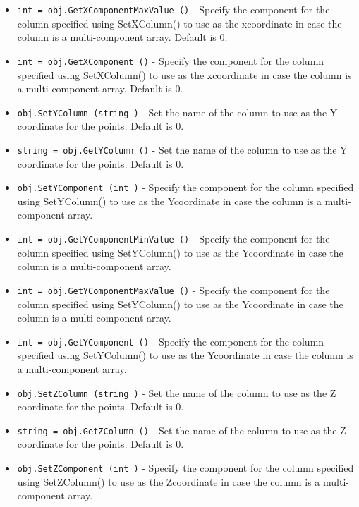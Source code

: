 \begin{itemize}
\item  \verb|int = obj.GetXComponentMaxValue ()| -  Specify the component for the column specified using SetXColumn() to
 use as the xcoordinate in case the column is a multi-component array.
 Default is 0.

\item  \verb|int = obj.GetXComponent ()| -  Specify the component for the column specified using SetXColumn() to
 use as the xcoordinate in case the column is a multi-component array.
 Default is 0.

\item  \verb|obj.SetYColumn (string )| -  Set the name of the column to use as the Y coordinate for the points. 
 Default is 0.

\item  \verb|string = obj.GetYColumn ()| -  Set the name of the column to use as the Y coordinate for the points. 
 Default is 0.

\item  \verb|obj.SetYComponent (int )| -  Specify the component for the column specified using SetYColumn() to
 use as the Ycoordinate in case the column is a multi-component array.

\item  \verb|int = obj.GetYComponentMinValue ()| -  Specify the component for the column specified using SetYColumn() to
 use as the Ycoordinate in case the column is a multi-component array.

\item  \verb|int = obj.GetYComponentMaxValue ()| -  Specify the component for the column specified using SetYColumn() to
 use as the Ycoordinate in case the column is a multi-component array.

\item  \verb|int = obj.GetYComponent ()| -  Specify the component for the column specified using SetYColumn() to
 use as the Ycoordinate in case the column is a multi-component array.

\item  \verb|obj.SetZColumn (string )| -  Set the name of the column to use as the Z coordinate for the points.
 Default is 0.

\item  \verb|string = obj.GetZColumn ()| -  Set the name of the column to use as the Z coordinate for the points.
 Default is 0.

\item  \verb|obj.SetZComponent (int )| -  Specify the component for the column specified using SetZColumn() to
 use as the Zcoordinate in case the column is a multi-component array.


\end{itemize}

